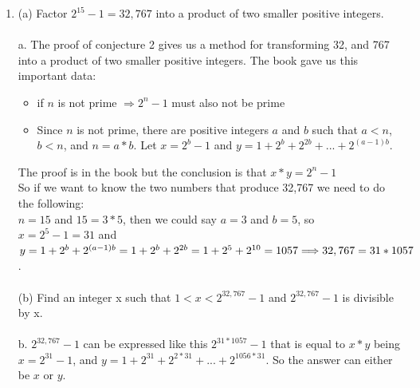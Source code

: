 \documentclass{article}
\begin{document}
\begin{enumerate}
    \item 
        (a) Factor $2^{15} - 1 = 32,767$ into a product of two smaller positive integers.\\\\
         a. The proof of conjecture 2 gives us a method for transforming 32, and 767 into a product of two smaller positive integers. The book gave us this important data:
         \begin{itemize}
              \item
              if $n$ is not prime $\Rightarrow 2^n - 1$ must also not be prime
              \item  
              Since $n$ is not prime, there are positive integers $a$ and $b$ such that $a<n$, $b<n$, and $n = a * b$. Let $x = 2^b - 1$ and $y = 1+ 2^b + 2^{2b} + ... + 2^{(a-1)b}$.
        \end{itemize}
         The proof is in the book but the conclusion is that \textbf{$x * y = 2^n - 1$}
         \\
         So if we want to know the two numbers that produce 32,767 we need to do the following:\\
         $n = 15$ and $15 = 3 * 5$, then we could say $a = 3$ and $b = 5$, so\\ $x = 2^5 - 1 = 31$ and\\ $y = 1 + 2^b + 2^{(a-1)b} = 1 + 2^b + 2^{2b} = 1 + 2^5 + 2^{10} = 1057\\ \Longrightarrow 32,767 = 31 * 1057$. 
         \\\\
        (b) Find an integer x such that $1 < x < 2^{32,767}- 1$ and $2^{32,767}- 1$ is divisible by x.\\\\
        b. $2^{32,767}- 1$ can be expressed like this $2^{31*1057}- 1$ that is equal to $x*y$ being $x =2^{31} - 1$, and $y = 1 + 2^{31} + 2^{2*31} + ... + 2^{1056*31}$. So the answer can either be $x$ or $y$.
        

\end{enumerate}
\end{document}
